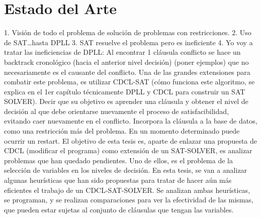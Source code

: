 \chapter{Estado del Arte}\label{chapter:state-of-the-art}
1.	Visión de todo el problema de solución de problemas con restricciones.
2.	Uso de SAT…hasta DPLL
3.	SAT resuelve el problema pero es ineficiente
4.	Yo voy a tratar las ineficiencias de DPLL:
Al encontrar 1 cláusula conflicto se hace un backtrack cronológico (hacia el anterior nivel decisión) (poner ejemplos) que no necesariamente es el causante del conflicto. Una de las grandes extensiones para combatir este problema, es utilizar CDCL-SAT (cómo funciona este algoritmo, se explica en el 1er capítulo técnicamente DPLL y CDCL para construir un SAT SOLVER). Decir que su objetivo es aprender una cláusula y obtener el nivel de decisión al que debe orientarse nuevamente el proceso de satisfacibilidad, evitando caer nuevamente en el conflicto. Incorpora la cláusula a la base de datos, como una restricción más del problema. En un momento determinado puede ocurrir un restart.
El objetivo de esta tesis es, aparte de enlazar una propuesta de CDCL (modificar el programa) como extensión de un SAT-SOLVER, es analizar problemas que han quedado pendientes. Uno de ellos, es el problema de la selección de variables en los niveles de decisión. En esta tesis, se van a analizar algunas heurísticas que han sido propuestas para tratar de hacer aún más eficientes el trabajo de un CDCL-SAT-SOLVER. Se analizan ambas heurísticas, se programan, y se realizan comparaciones para ver la efectividad de las mismas, que pueden estar sujetas al conjunto de cláusulas que tengan las variables.

